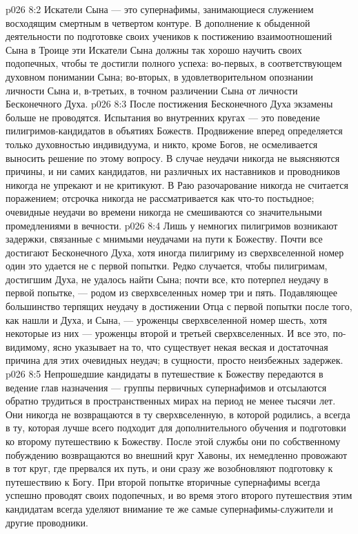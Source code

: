 \vs p026 8:2 Искатели Сына --- это супернафимы, занимающиеся служением восходящим смертным в четвертом контуре. В дополнение к обыденной деятельности по подготовке своих учеников к постижению взаимоотношений Сына в Троице эти Искатели Сына должны так хорошо научить своих подопечных, чтобы те достигли полного успеха: во\hyp{}первых, в соответствующем духовном понимании Сына; во\hyp{}вторых, в удовлетворительном опознании личности Сына и, в\hyp{}третьих, в точном различении Сына от личности Бесконечного Духа.
\vs p026 8:3 После постижения Бесконечного Духа экзамены больше не проводятся. Испытания во внутренних кругах --- это поведение пилигримов\hyp{}кандидатов в объятиях Божеств. Продвижение вперед определяется только духовностью индивидуума, и никто, кроме Богов, не осмеливается выносить решение по этому вопросу. В случае неудачи никогда не выясняются причины, и ни самих кандидатов, ни различных их наставников и проводников никогда не упрекают и не критикуют. В Раю разочарование никогда не считается поражением; отсрочка никогда не рассматривается как что\hyp{}то постыдное; очевидные неудачи во времени никогда не смешиваются со значительными промедлениями в вечности.
\vs p026 8:4 \pc Лишь у немногих пилигримов возникают задержки, связанные с мнимыми неудачами на пути к Божеству. Почти все достигают Бесконечного Духа, хотя иногда пилигриму из сверхвселенной номер один это удается не с первой попытки. Редко случается, чтобы пилигримам, достигшим Духа, не удалось найти Сына; почти все, кто потерпел неудачу в первой попытке, --- родом из сверхвселенных номер три и пять. Подавляющее большинство терпящих неудачу в достижении Отца с первой попытки после того, как нашли и Духа, и Сына, --- уроженцы сверхвселенной номер шесть, хотя некоторые из них --- уроженцы второй и третьей сверхвселенных. И все это, по\hyp{}видимому, ясно указывает на то, что существует некая веская и достаточная причина для этих очевидных неудач; в сущности, просто неизбежных задержек.
\vs p026 8:5 Непрошедшие кандидаты в путешествие к Божеству передаются в ведение глав назначения --- группы первичных супернафимов и отсылаются обратно трудиться в пространственных мирах на период не менее тысячи лет. Они никогда не возвращаются в ту сверхвселенную, в которой родились, а всегда в ту, которая лучше всего подходит для дополнительного обучения и подготовки ко второму путешествию к Божеству. После этой службы они по собственному побуждению возвращаются во внешний круг Хавоны, их немедленно провожают в тот круг, где прервался их путь, и они сразу же возобновляют подготовку к путешествию к Богу. При второй попытке вторичные супернафимы всегда успешно проводят своих подопечных, и во время этого второго путешествия этим кандидатам всегда уделяют внимание те же самые супернафимы\hyp{}служители и другие проводники.
